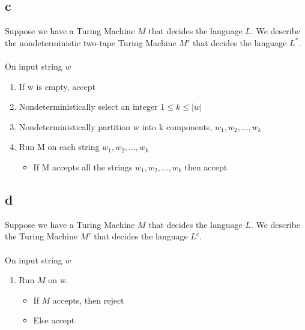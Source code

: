 \documentclass{article}
\begin{document}
\subsection*{c}
Suppose we have a Turing Machine $M$ that decides the language $L$. We describe the nondeterministic two-tape Turing Machine $M'$ that decides the language $L^*$.\\\\
On input string $w$
\begin{enumerate}
    \item If w is empty, accept
    \item Nondeterministically select an integer $ 1 \leq k \leq |w| $
    \item Nondeterministically partition w into k components, $w_1, w_2, ..., w_k$
    \item Run M on each string $w_1, w_2, ..., w_k$
        \begin {itemize}
        		\item If M accepts all the strings $w_1, w_2, ..., w_k$ then accept
        \end{itemize}
\end{enumerate}

\subsection*{d}
Suppose we have a Turing Machine $M$ that decides the language $L$. We describe the Turing Machine $M'$ that decides the language $L^c$.\\\\
On input string $w$
\begin{enumerate}
    \item Run $M$ on w. 
    \begin{itemize}
        \item If $M$ accepts, then reject
        \item Else accept
    \end{itemize}
\end{enumerate}
\end{document}
